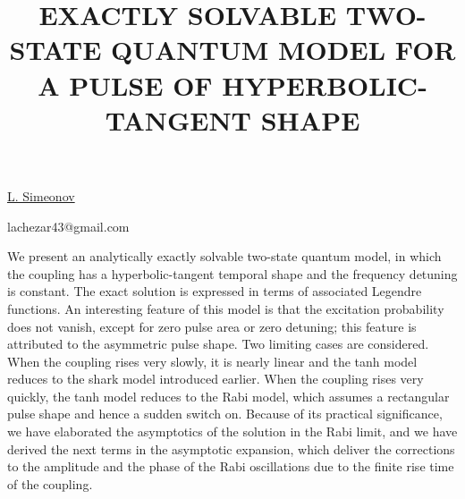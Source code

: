 \title{EXACTLY SOLVABLE TWO-STATE QUANTUM MODEL FOR A PULSE OF HYPERBOLIC-TANGENT SHAPE}

\underline{L. Simeonov} 

{\normalsize{\vspace{-4mm}

\unisofia

\email lachezar43@gmail.com}}

We present an analytically exactly solvable two-state quantum model, in which the coupling has a hyperbolic-tangent
temporal shape and the frequency detuning is constant. The exact solution is expressed in terms of
associated Legendre functions. An interesting feature of this model is that the excitation probability does not
vanish, except for zero pulse area or zero detuning; this feature is attributed to the asymmetric pulse shape.
Two limiting cases are considered. When the coupling rises very slowly, it is nearly linear and the tanh model
reduces to the shark model introduced earlier. When the coupling rises very quickly, the tanh model reduces to
the Rabi model, which assumes a rectangular pulse shape and hence a sudden switch on. Because of its practical
significance, we have elaborated the asymptotics of the solution in the Rabi limit, and we have derived the next
terms in the asymptotic expansion, which deliver the corrections to the amplitude and the phase of the Rabi
oscillations due to the finite rise time of the coupling.

\vspace{\baselineskip}
